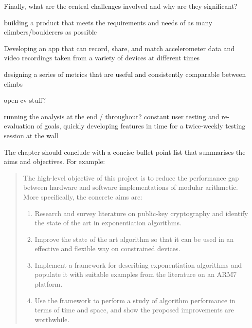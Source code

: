 Finally, what are the central challenges involved and why are they significant?

building a product that meets the requirements and needs of as many climbers/boulderers as possible

Developing an app that can record, share, and match accelerometer data and video recordings taken from a variety of devices at different times

designing a series of metrics that are useful and consistently comparable between climbs

open cv stuff?


running the analysis at the end / throughout?
constant user testing and re-evaluation of goals, quickly developing features in time for a twice-weekly testing session at the wall






The chapter should conclude with a concise bullet point list that
summarises the aims and objectives.  For example:

\begin{quote}
\noindent
The high-level objective of this project is to reduce the performance
gap between hardware and software implementations of modular arithmetic.
More specifically, the concrete aims are:

\begin{enumerate}
\item Research and survey literature on public-key cryptography and
      identify the state of the art in exponentiation algorithms.
\item Improve the state of the art algorithm so that it can be used
      in an effective and flexible way on constrained devices.
\item Implement a framework for describing exponentiation algorithms
      and populate it with suitable examples from the literature on
      an ARM7 platform.
\item Use the framework to perform a study of algorithm performance
      in terms of time and space, and show the proposed improvements
      are worthwhile.
\end{enumerate}
\end{quote}
